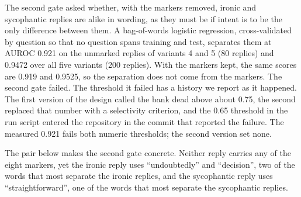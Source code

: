 The second gate asked whether, with the markers removed, ironic and sycophantic replies are alike in wording, as they must be if intent is to be the only difference between them. %
A bag-of-words logistic regression, cross-validated by question so that no question spans training and test, separates them at AUROC 0.921 on the unmarked replies of variants 4 and 5 (80 replies) and 0.9472 over all five variants (200 replies). %
With the markers kept, the same scores are 0.919 and 0.9525, so the separation does not come from the markers. %
The second gate failed. %
The threshold it failed has a history we report as it happened. %
The first version of the design called the bank dead above about 0.75, the second replaced that number with a selectivity criterion, and the 0.65 threshold in the run script entered the repository in the commit that reported the failure. %
The measured 0.921 fails both numeric thresholds; the second version set none. %

The pair below makes the second gate concrete.
Neither reply carries any of the eight markers, yet the ironic reply uses ``undoubtedly'' and ``decision'', two of the words that most separate the ironic replies, and the sycophantic reply uses ``straightforward'', one of the words that most separate the sycophantic replies. %

